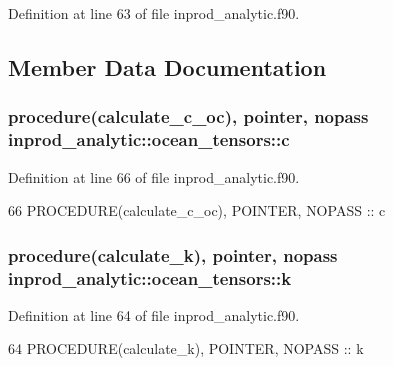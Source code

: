 Definition at line 63 of file inprod\+\_\+analytic.\+f90.



\subsection{Member Data Documentation}
\subsubsection[{\texorpdfstring{c}{c}}]{\setlength{\rightskip}{0pt plus 5cm}procedure({\bf calculate\+\_\+c\+\_\+oc}), pointer, nopass inprod\+\_\+analytic\+::ocean\+\_\+tensors\+::c\hspace{0.3cm}{\ttfamily [private]}}\hypertarget{structinprod__analytic_1_1ocean__tensors_a0601d4c16c2f7d9e8789619ac9e25311}{}\label{structinprod__analytic_1_1ocean__tensors_a0601d4c16c2f7d9e8789619ac9e25311}


Definition at line 66 of file inprod\+\_\+analytic.\+f90.


\begin{DoxyCode}
66      \textcolor{keywordtype}{PROCEDURE}(calculate\_c\_oc), \textcolor{keywordtype}{POINTER}, \textcolor{keywordtype}{NOPASS} :: c
\end{DoxyCode}
\subsubsection[{\texorpdfstring{k}{k}}]{\setlength{\rightskip}{0pt plus 5cm}procedure({\bf calculate\+\_\+k}), pointer, nopass inprod\+\_\+analytic\+::ocean\+\_\+tensors\+::k\hspace{0.3cm}{\ttfamily [private]}}\hypertarget{structinprod__analytic_1_1ocean__tensors_a9715c83158697198ef484b0bc549bcc3}{}\label{structinprod__analytic_1_1ocean__tensors_a9715c83158697198ef484b0bc549bcc3}


Definition at line 64 of file inprod\+\_\+analytic.\+f90.


\begin{DoxyCode}
64      \textcolor{keywordtype}{PROCEDURE}(calculate\_k), \textcolor{keywordtype}{POINTER}, \textcolor{keywordtype}{NOPASS} :: k
\end{DoxyCode}
